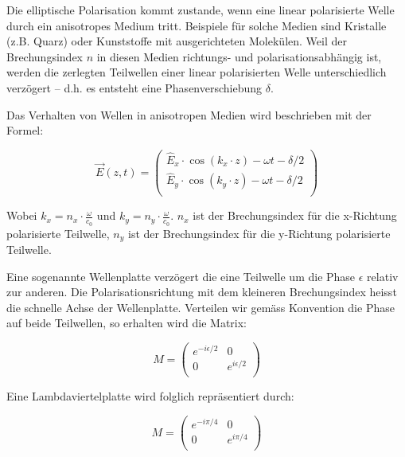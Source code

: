 Die elliptische Polarisation kommt zustande, wenn eine linear polarisierte Welle
durch ein anisotropes Medium tritt. Beispiele f\"ur solche Medien sind Kristalle
(z.B.  Quarz)  oder  Kunststoffe  mit  ausgerichteten   Molek\"ulen.   Weil  der
Brechungsindex $n$ in diesen Medien richtungs- und polarisationsabh\"angig  ist,
werden die zerlegten Teilwellen einer linear polarisierten Welle unterschiedlich
verz\"ogert  -- d.h. es entsteht eine Phasenverschiebung $\delta$.

Das Verhalten von Wellen  in anisotropen Medien wird beschrieben mit der Formel:

\begin{equation}
    \vec{E}(z,t) = \begin{pmatrix}
        \hat{E}_x\cdot\cos(k_x \cdot z) - \omega t - \delta/2 \\
        \hat{E}_y\cdot\cos(k_y \cdot z) - \omega t - \delta/2 \\
    \end{pmatrix}
\end{equation}

Wobei   $k_x   =   n_x   \cdot   \frac{\omega}{c_0}$   und  $k_y  =  n_y   \cdot
\frac{\omega}{c_0}$.   $n_x$   ist   der  Brechungsindex  f\"ur  die  x-Richtung
polarisierte Teilwelle,  $n_y$  ist  der  Brechungsindex  f\"ur  die  y-Richtung
polarisierte Teilwelle.

Eine  sogenannte  Wellenplatte  verz\"ogert  die eine  Teilwelle  um  die  Phase
$\epsilon$ relativ  zur  anderen.  Die  Polarisationsrichtung  mit dem kleineren
Brechungsindex  heisst  die  schnelle  Achse  der  Wellenplatte.  Verteilen  wir
gem\"ass Konvention die Phase auf beide Teilwellen, so erhalten wird die Matrix:

\begin{equation}
    M = \begin{pmatrix}
        e^{-i\epsilon/2} & 0 \\
        0 & e^{ i\epsilon/2} \\
    \end{pmatrix}
\end{equation}

Eine Lambdaviertelplatte wird folglich repr\"asentiert durch:

\begin{equation}
    M = \begin{pmatrix}
        e^{-i\pi/4} & 0 \\
        0 & e^{ i\pi/4} \\
    \end{pmatrix}
\end{equation}


